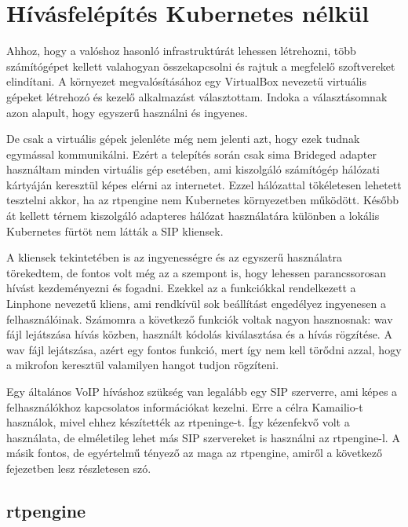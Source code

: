 \chapter{Hívásfelépítés Kubernetes nélkül}

Ahhoz, hogy a valóshoz hasonló infrastruktúrát lehessen létrehozni, több 
számítógépet kellett valahogyan összekapcsolni és rajtuk a megfelelő szoftvereket
elindítani. A környezet megvalósításához egy VirtualBox nevezetű virtuális gépeket
létrehozó és kezelő alkalmazást választottam. Indoka a választásomnak azon
alapult, hogy egyszerű használni és ingyenes.

De csak a virtuális gépek jelenléte még nem jelenti azt, hogy ezek tudnak egymással
kommunikálni. Ezért a telepítés során csak sima Brideged adapter használtam minden
virtuális gép esetében, ami kiszolgáló számítógép hálózati kártyáján keresztül
képes elérni az internetet. Ezzel hálózattal tökéletesen lehetett tesztelni
akkor, ha az rtpengine nem Kubernetes környezetben működött. Később át kellett
térnem kiszolgáló adapteres hálózat használatára különben a lokális Kubernetes 
fürtöt nem látták a SIP kliensek. 

A kliensek tekintetében is az ingyenességre és az egyszerű használatra törekedtem, 
de fontos volt még az a szempont is, hogy lehessen parancssorosan hívást kezdeményezni
és fogadni. Ezekkel az a funkciókkal rendelkezett a Linphone nevezetű kliens, ami
rendkívül sok beállítást engedélyez ingyenesen a felhasználóinak. Számomra a következő
funkciók voltak nagyon hasznosnak: wav fájl lejátszása hívás közben, használt kódolás
kiválasztása és a hívás rögzítése. A wav fájl lejátszása, azért egy fontos funkció, mert
így nem kell törődni azzal, hogy a mikrofon keresztül valamilyen hangot tudjon rögzíteni.

Egy általános VoIP híváshoz szükség van legalább egy SIP szerverre, ami képes a felhasználókhoz
kapcsolatos információkat kezelni. Erre a célra Kamailio-t használok, mivel ehhez készítették
az rtpeninge-t. Így kézenfekvő volt a használata, de elméletileg lehet más SIP szervereket
is használni az rtpengine-l. A másik fontos, de egyértelmű tényező az maga az rtpengine, 
amiről a következő fejezetben lesz részletesen szó. 

\section{rtpengine}

